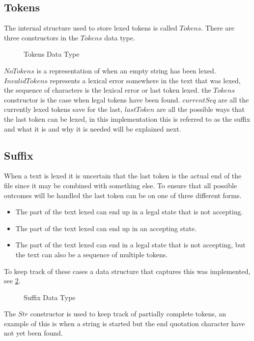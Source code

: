 \subsection{Tokens}
The internal structure used to store lexed tokens is called $Tokens$. There are
three constructors in the $Tokens$ data type.

\begin{figure}[h!]
  
  \caption{Tokens Data Type\label{fig:tokens}}
\end{figure}

$NoTokens$ is a representation of when an empty string has been lexed.
$InvalidTokens$ represents a lexical error somewhere in the text that was lexed,
the sequence of characters is the lexical error or last token lexed. the
$Tokens$ constructor is the case when legal tokens have been found. $currentSeq$
are all the currently lexed tokens save for the last, $lastToken$ are all the
possible ways that the last token can be lexed, in this implementation this is
referred to as the suffix and what it is and why it is needed will be explained
next.

\subsection{Suffix}\label{sub:suff}
When a text is lexed it is uncertain that the last token is the actual end of
the file since it may be combined with something else. To ensure that all
possible outcomes will be handled the last token can be on one of three different
forms.

\begin{itemize}
\item The part of the text lexed can end up in a legal state that is not
accepting.
\item The part of the text lexed can end up in an accepting state.
\item The part of the text lexed can end in a legal state that is not
accepting, but the text can also be a sequence of multiple tokens.
\end{itemize}
To keep track of these cases a data structure that captures this was
implemented, see \cref{fig:suff}.

\begin{figure}[h!]
  
  \caption{Suffix Data Type\label{fig:suff}}
\end{figure}

The $Str$ constructor is used to keep track of partially complete tokens, an
example of this is when a string is started but the end quotation character have
not yet been found.


